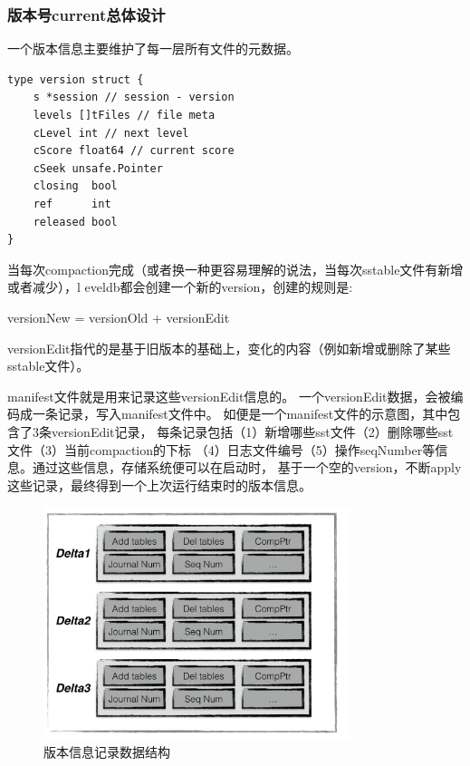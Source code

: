 		\subsubsection{版本号current总体设计}

		一个版本信息主要维护了每一层所有文件的元数据。
		\begin{lstlisting}[caption=version , label=code_radds_storage_tfile]
type version struct {
    s *session // session - version
    levels []tFiles // file meta
    cLevel int // next level
    cScore float64 // current score
    cSeek unsafe.Pointer
    closing  bool
    ref      int
    released bool
}
		\end{lstlisting}

		当每次compaction完成（或者换一种更容易理解的说法，当每次sstable文件有新增或者减少），l
		eveldb都会创建一个新的version，创建的规则是:

		versionNew = versionOld + versionEdit

		versionEdit指代的是基于旧版本的基础上，变化的内容（例如新增或删除了某些sstable文件）。

		manifest文件就是用来记录这些versionEdit信息的。
		一个versionEdit数据，会被编码成一条记录，写入manifest文件中。
		如便是一个manifest文件的示意图，其中包含了3条versionEdit记录，
		每条记录包括（1）新增哪些sst文件（2）删除哪些sst文件（3）当前compaction的下标
		（4）日志文件编号（5）操作seqNumber等信息。通过这些信息，存储系统便可以在启动时，
		基于一个空的version，不断apply这些记录，最终得到一个上次运行结束时的版本信息。

		\begin{figure}[H]
			\centering
			\includegraphics[width=0.80\textwidth]{images/manifest}
			\caption{版本信息记录数据结构}
			\label{radds_storage_manifest}
		\end{figure}

	
	
